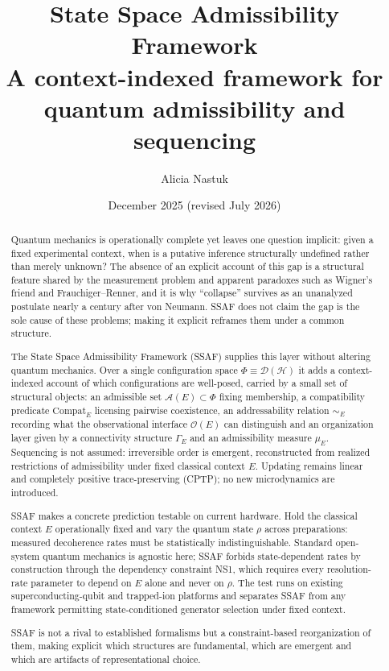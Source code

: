 \documentclass[aps,prx,onecolumn,11pt]{revtex4-2}
\theoremstyle{plain}
\theoremstyle{definition}
\theoremstyle{remark}
\begin{document}
\title{%
State Space Admissibility Framework\\[0.6em]
\large A context-indexed framework for quantum admissibility and sequencing
}

\author{Alicia Nastuk}
\date{December 2025 (revised July 2026)}

\vspace{1.2\baselineskip}

\begin{abstract}
Quantum mechanics is operationally complete yet leaves one question
implicit: given a fixed experimental context, when is a putative
inference structurally undefined rather than merely unknown? The
absence of an explicit account of this gap is a structural feature
shared by the measurement problem and apparent paradoxes such as
Wigner's friend and Frauchiger--Renner, and it is why ``collapse''
survives as an unanalyzed postulate nearly a century after von
Neumann. SSAF does not claim the gap is the sole cause of these
problems; making it explicit reframes them under a common structure.

The State Space Admissibility Framework (SSAF) supplies this layer
without altering quantum mechanics. Over a single configuration space
$\Phi \equiv \mathcal{D}(\mathcal{H})$ it adds a context-indexed
account of which configurations are well-posed, carried by a small
set of structural objects: an admissible set
$\mathcal{A}(E) \subset \Phi$ fixing membership, a compatibility
predicate $\mathrm{Compat}_E$ licensing pairwise coexistence, an
addressability relation $\sim_E$ recording what the observational
interface $\mathcal{O}(E)$ can distinguish and an organization layer
given by a connectivity structure $\Gamma_E$ and an admissibility
measure $\mu_E$. Sequencing is not assumed: irreversible order is
emergent, reconstructed from realized restrictions of admissibility
under fixed classical context $E$. Updating remains linear and
completely positive trace-preserving (CPTP); no new microdynamics are
introduced.

SSAF makes a concrete prediction testable on current hardware. Hold
the classical context $E$ operationally fixed and vary the quantum
state $\rho$ across preparations: measured decoherence rates must be
statistically indistinguishable. Standard open-system quantum
mechanics is agnostic here; SSAF forbids state-dependent rates by
construction through the dependency constraint NS1, which requires
every resolution-rate parameter to depend on $E$ alone and never on
$\rho$. The test runs on existing superconducting-qubit and
trapped-ion platforms and separates SSAF from any framework
permitting state-conditioned generator selection under fixed context.

SSAF is not a rival to established formalisms but a constraint-based
reorganization of them, making explicit which structures are
fundamental, which are emergent and which are artifacts of
representational choice.

\medskip
\end{abstract}
\end{document}
